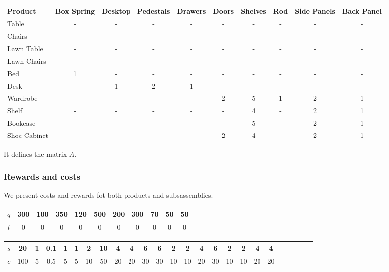 \documentclass{amsart}
\begin{document}
\small
\begin{longtable}{| l | c | c | c | c | c | c | c | c | c |}
\hline
\textbf{Product} & \textbf{Box Spring} & \textbf{Desktop} & \textbf{Pedestals} & \textbf{Drawers} & \textbf{Doors} & \textbf{Shelves} & \textbf{Rod} & \textbf{Side Panels} & \textbf{Back Panel} \\
\hline
Table & - & - & - & - & - & - & - & - & - \\
\hline
Chairs & - & - & - & - & - & - & - & - & - \\
\hline
Lawn Table & - & - & - & - & - & - & - & - & - \\
\hline
Lawn Chairs & - & - & - & - & - & - & - & - & - \\
\hline
Bed & 1 & - & - & - & - & - & - & - & - \\
\hline
Desk & - & 1 & 2 & 1 & - & - & - & - & - \\
\hline
Wardrobe & - & - & - & - & 2 & 5 & 1 & 2 & 1 \\
\hline
Shelf & - & - & - & - & - & 4 & - & 2 & 1 \\
\hline
Bookcase & - & - & - & - & - & 5 & - & 2 & 1 \\
\hline
Shoe Cabinet & - & - & - & - & 2 & 4 & - & 2 & 1 \\
\hline
\end{longtable}
It defines the matrix $A$.

\subsubsection{Rewards and costs}

We present costs and rewards fot both products and subsassemblies.


\begin{table}[ht]
    \centering
\begin{tabular}{|c|c|c|c|c|c|c|c|c|c|c|c|c|}
\hline
    $q$  &  300 & 100 & 350 & 120 & 500 & 200 & 300 & 70 & 50 & 50 \\
    \hline
    $l$  & 0 &0&0&0&0&0&0&0&0&0 \\
    \hline
\end{tabular}
\end{table}



\begin{table}[ht]
    \centering
\begin{tabular}{|c|c|c|c|c|c|c|c|c|c|c|c|c|c|c|c|c|c|c|c|c|c|c|c|c|}
\hline
    $s$  &  20 & 1 & 0.1 & 1 & 1 & 2 & 10 & 4 & 4 & 6 &6&2&2&4&6&2&2&4&4\\
    \hline
    $c$  & 100 & 5 &0.5& 5 & 5& 10& 50 & 20 & 20 & 30 & 30 &10& 10 & 20&30&10&10&20&20 \\
    \hline
\end{tabular}
\end{table}
\end{document}
